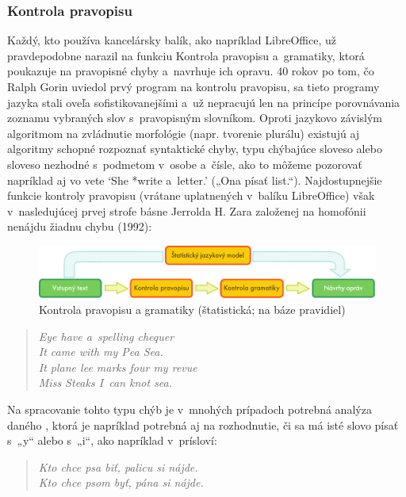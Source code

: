 \begin{multicols}{2}
\subsubsection{Kontrola pravopisu}
Každý, kto používa kancelársky balík, ako napríklad LibreOffice, už pravdepodobne narazil na funkciu Kontrola pravopisu a~gramatiky, ktorá poukazuje na pravopisné chyby a~navrhuje ich opravu. 40 rokov po tom, čo Ralph Gorin uviedol prvý program na kontrolu pravopisu, sa tieto programy jazyka stali oveľa sofistikovanejšími a~už nepracujú len na princípe porovnávania zoznamu vybraných slov s~pravopisným slovníkom. Oproti jazykovo závislým algoritmom na zvládnutie morfológie (napr. tvorenie plurálu) existujú aj algoritmy schopné rozpoznať syntaktické chyby, typu chýbajúce sloveso alebo sloveso nezhodné s~podmetom v~osobe a~čísle, ako to môžeme pozorovať napríklad aj vo vete ‘She *write a~letter.’ („Ona písať list.“). Najdostupnejšie funkcie kontroly pravopisu (vrátane uplatnených v~balíku LibreOffice) však v~nasledujúcej prvej strofe básne Jerrolda H. Zara založenej na homofónii nenájdu žiadnu chybu (1992)\cite{f22}:

\begin{figure}[htb]
  \center
  \includegraphics[width=\textwidth]{../_media/slovak/language_checking}
  \caption{Kontrola pravopisu a gramatiky (štatistická; na báze pravidiel)}
  \label{fig:langcheckingaarch_sk}
\end{figure}

\begin{verse}
\emph{%
Eye have a~spelling chequer\\
It came with my Pea Sea.\\
It plane lee marks four my revue\\
Miss Steaks I~can knot sea.
}
\end{verse}

Na spracovanie tohto typu chýb je v~mnohých prípadoch potrebná analýza daného , ktorá je napríklad potrebná aj na rozhodnutie, či sa má isté slovo písať s~„y“ alebo s~„i“, ako napríklad v~prísloví:

\begin{verse}
\emph{%
Kto chce psa biť, palicu si nájde.\\
\smallskip
Kto chce psom byť, pána si nájde.
}
\end{verse}


\end{multicols}
